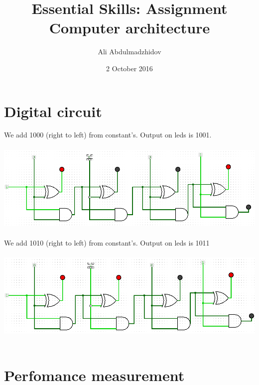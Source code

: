 \documentclass[10pt]{article}
\title{Essential Skills: Assignment Computer architecture}
\date{2 October 2016}
\author{Ali Abdulmadzhidov}
\begin{document}
\renewcommand*\rmdefault{cmss}
\maketitle
\section{Digital circuit}
We add 1000 (right to left) from constant's. Output on leds is 1001. \\ \\
\includegraphics[width=\textwidth, scale=0.5]{circuit1} \\ \\
We add 1010 (right to left) from constant's. Output on leds is 1011 \\ \\
\includegraphics[width=\textwidth, scale=0.5]{circuit2} \\ \\

\section{Perfomance measurement}
\end{document}
